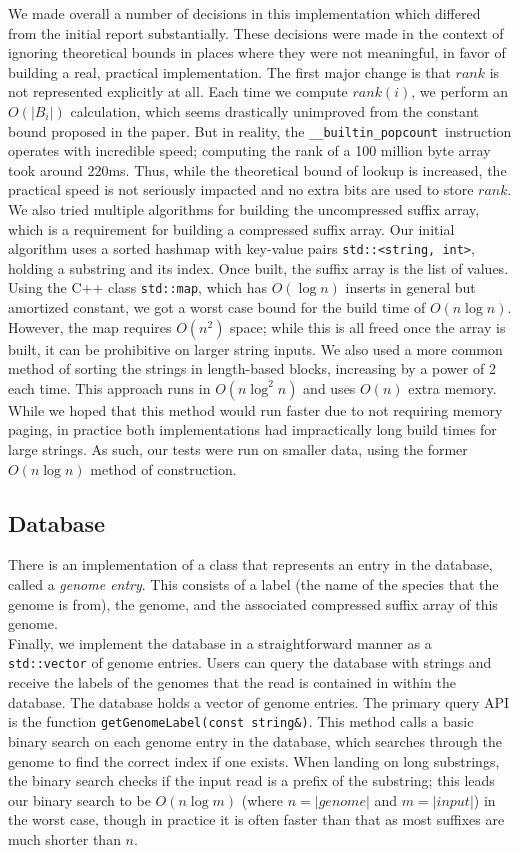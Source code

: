 \documentclass{article}
\newcommand{\popcnt}{\texttt{\_\_builtin\_popcount }}
\begin{document}
\indent We made overall a number of decisions in this implementation which differed from the initial report substantially. These decisions were made in the context of ignoring theoretical bounds in places where they were not meaningful, in favor of building a real, practical implementation. The first major change is that $rank$ is not represented explicitly at all. Each time we compute $rank(i)$, we perform an $O(|B_i|)$ calculation, which seems drastically unimproved from the constant bound proposed in the paper. But in reality, the \popcnt instruction operates with incredible speed; computing the rank of a 100 million byte array took around 220ms. Thus, while the theoretical bound of lookup is increased, the practical speed is not seriously impacted and no extra bits are used to store $rank$.\\
\indent We also tried multiple algorithms for building the uncompressed suffix array, which is a requirement for building a compressed suffix array. Our initial algorithm uses a sorted hashmap with key-value pairs \texttt{std::<string, int>}, holding a substring and its index. Once built, the suffix array is the list of values. Using the C++ class \texttt{std::map}, which has $O(\log n)$ inserts in general but amortized constant, we got a worst case bound for the build time of $O(n\log n)$. However, the map requires $O(n^2)$ space; while this is all freed once the array is built, it can be prohibitive on larger string inputs. We also used a more common method of sorting the strings in length-based blocks, increasing by a power of 2 each time. This approach runs in $O(n \log^2 n)$ and uses $O(n)$ extra memory. While we hoped that this method would run faster due to not requiring memory paging, in practice both implementations had impractically long build times for large strings. As such, our tests were run on smaller data, using the former $O(n\log n)$ method of construction.
\subsection{Database}
\label{subsec-db}
\indent There is an implementation of a class that represents an entry in the database, called a \emph{genome entry}. This consists of a label (the name of the species that the genome is from), the genome, and the associated compressed suffix array of this genome.\\
\indent Finally, we implement the database in a straightforward manner as a \texttt{std::vector} of genome entries. Users can query the database with strings and receive the labels of the genomes that the read is contained in within the database. The database holds a vector of genome entries. The primary query API is the function \texttt{getGenomeLabel(const string\&)}. This method calls a basic binary search on each genome entry in the database, which searches through the genome to find the correct index if one exists. When landing on long substrings, the binary search checks if the input read is a prefix of the substring; this leads our binary search to be $O(n \log m)$ (where $n = |genome|$ and $m = |input|$) in the worst case, though in practice it is often faster than that as most suffixes are much shorter than $n$.\\
\end{document}
